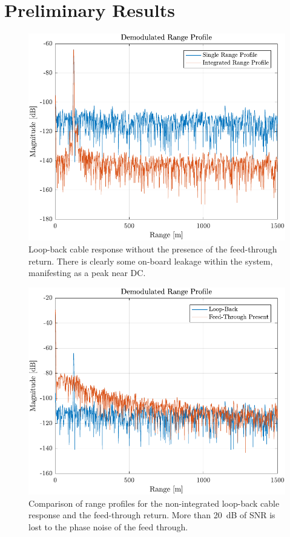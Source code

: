 \documentclass[a4paper,11pt]{report}
\begin{document}
\section{Preliminary Results}
\begin{figure}[h!]
    \begin{center}
        \includegraphics[width=\textwidth]{images/loop_back}
        \caption{Loop-back cable response without the presence of the feed-through return. There is clearly some on-board leakage within the system, manifesting as a peak near DC.}
        \label{fig:loop_back}
    \end{center}
\end{figure}

\begin{figure}[h!]
    \begin{center}
        \includegraphics[width=\textwidth]{images/feed_through}
        \caption{Comparison of range profiles for the non-integrated loop-back cable response and the feed-through return. More than \SI{20}{\dB} of SNR is lost to the phase noise of the feed through.}
        \label{fig:feed_through}
    \end{center}
\end{figure}
\end{document}
